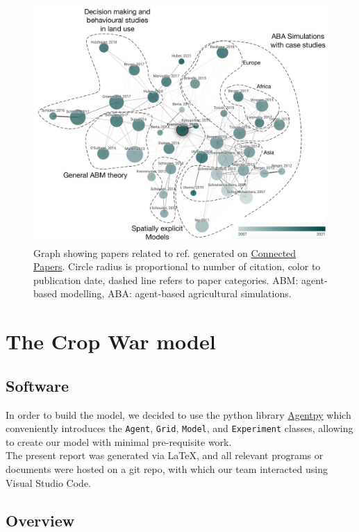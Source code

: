 \documentclass[a4paper,12pt]{article} %
\begin{document}
\begin{figure}[tb]
	\includegraphics[width=.8\textwidth]{Figures/StateOfTheArt2.pdf}
	\centering
	\caption{\small Graph showing papers related to ref. \cite{kremmydasReviewAgentBased2018} generated on \href{https://www.connectedpapers.com/main/35fac7b643317e5f48f5280fadec94051bf2401f/A-review-of-Agent-Based-Modeling-for-agricultural-policy-evaluation/graph}{Connected Papers}. Circle radius is proportional to number of citation, color to publication date, dashed line refers to paper categories. ABM: agent-based modelling, ABA: agent-based agricultural simulations.}
	\label{fig:State_of_the_art}
\end{figure}

\section{The Crop War model}

\subsection{Software}
In order to build the model, we decided to use the python library \href{https://agentpy.readthedocs.io/en/stable/overview.html}{Agentpy} which conveniently introduces the \texttt{Agent}, \texttt{Grid}, \texttt{Model}, and \texttt{Experiment} classes, allowing to create our model with minimal pre-requisite work.\\
The present report was generated via LaTeX, and all relevant programs or documents were hosted on a git repo, with which our team interacted using Visual Studio Code.

\subsection{Overview}
\end{document}
